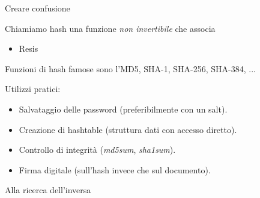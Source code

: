 \documentclass[xcolor=dvipsnames,aspectratio=169]{beamer}
\begin{document}
\begin{frame}{Creare confusione}

Chiamiamo hash una funzione \textit{non invertibile} che associa 

\begin{itemize}
  \item Resis
\end{itemize}


\pause

Funzioni di hash famose sono l'MD5, SHA-1, SHA-256, SHA-384, ...

\pause

Utilizzi pratici:

\begin{itemize}
  \item Salvataggio delle password (preferibilmente con un salt).
  \item Creazione di hashtable (struttura dati con accesso diretto).
  \item Controllo di integrità (\textit{md5sum}, \textit{sha1sum}).
  \item Firma digitale (sull'hash invece che sul documento).
\end{itemize}

\end{frame}

\begin{frame}{Alla ricerca dell'inversa}
  
\end{frame}
\end{document}
